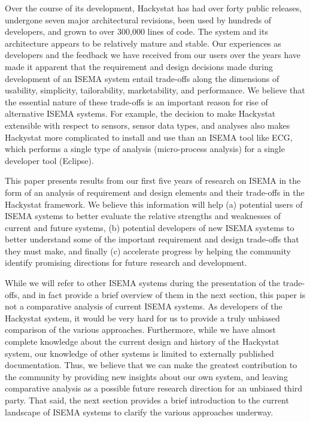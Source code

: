 \documentclass[10pt,twocolumn]{article}
\begin{document}
Over the course of its development, Hackystat has had over forty public
releases, undergone seven major architectural revisions, 
been used by hundreds of developers, and grown to over 300,000 lines of
code. The system and its architecture appears to be relatively mature and
stable. Our experiences as developers and the feedback we have received
from our users over the years have made it apparent that the requirement
and design decisions made during development of an ISEMA system entail
trade-offs along the dimensions of usability, simplicity, tailorability,
marketability, and performance.  We believe that the essential nature of
these trade-offs is an important reason for rise of alternative ISEMA
systems.  For example, the decision to make Hackystat extensible with respect to
sensors, sensor data types, and analyses also makes Hackystat more
complicated to install and use than an ISEMA tool like ECG, which performs
a single type of analysis (micro-process analysis) for a single developer
tool (Eclipse).

This paper presents results from our first five years of research on ISEMA
in the form of an analysis of requirement and design elements and
their trade-offs in the Hackystat framework.  We believe this information
will help (a) potential users of ISEMA systems to better evaluate the
relative strengths and weaknesses of current and future systems, (b)
potential developers of new ISEMA systems to better understand some of the
important requirement and design trade-offs that they must make, and
finally (c) accelerate progress by helping the community identify promising
directions for future research and development.

While we will refer to other ISEMA systems during the presentation of the
trade-offs, and in fact provide a brief overview of them in the next
section, this paper is not a comparative analysis of current ISEMA systems.
As developers of the Hackystat system, it would be very hard for us to
provide a truly unbiased comparison of the various approaches. Furthermore,
while we have almost complete knowledge about the current design and
history of the Hackystat system, our knowledge of other systems is limited
to externally published documentation. Thus, we believe that we can make
the greatest contribution to the community by providing new insights about
our own system, and leaving comparative analysis as a possible future
research direction for an unbiased third party.  That said, the next
section provides a brief introduction to the current landscape of ISEMA
systems to clarify the various approaches underway.
\end{document}
